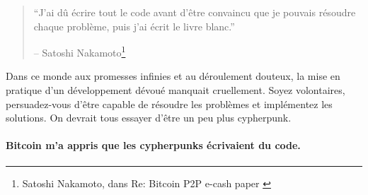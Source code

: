 \begin{quotation}\begin{samepage}
\enquote{J'ai dû écrire tout le code avant d'être convaincu que je pouvais
résoudre chaque problème, puis j'ai écrit le livre blanc.}
\begin{flushright} -- Satoshi Nakamoto\footnote{Satoshi Nakamoto, dans Re:
Bitcoin P2P e-cash paper \cite{satoshi-mail-code-first}}
\end{flushright}\end{samepage}\end{quotation}

Dans ce monde aux promesses infinies et au déroulement douteux, la mise en
pratique d'un développement dévoué manquait cruellement. Soyez volontaires,
persuadez-vous d'être capable de résoudre les problèmes et implémentez les
solutions. On devrait tous essayer d'être un peu plus cypherpunk.

\paragraph{Bitcoin m'a appris que les cypherpunks écrivaient du code.}

%
%
%
%
